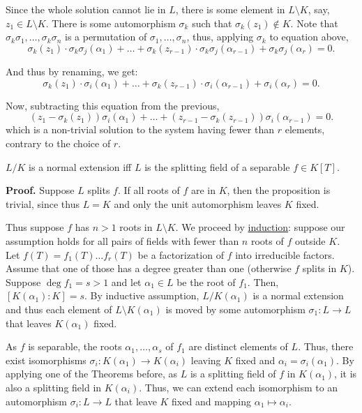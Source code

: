 \documentclass{template}
\begin{document}
Since the whole solution cannot lie in $L$, there is some element in $L
\setminus K$, say, $z_1 \in L \setminus K$. There is some automorphism
$\sigma_k$ such that $\sigma_k(z_1) \not\in K$. Note that
$\sigma_k\sigma_1,\dots,\sigma_k\sigma_n$ is a permutation of
$\sigma_1,\dots,\sigma_n$, thus, applying $\sigma_k$ to equation above,
\begin{equation*}
    \sigma_k(z_1) \cdot \sigma_k\sigma_j(\alpha_1) + \dots + \sigma_k(z_{r-1}) \cdot \sigma_k\sigma_j(\alpha_{r-1}) + \sigma_k\sigma_j(\alpha_r) = 0.
\end{equation*}

And thus by renaming, we get:
\begin{equation*}
    \sigma_k(z_1) \cdot \sigma_i(\alpha_1) + \dots + \sigma_k(z_{r-1}) \cdot \sigma_i(\alpha_{r-1}) + \sigma_i(\alpha_r) = 0.
\end{equation*}

Now, subtracting this equation from the previous,
\begin{equation*}
    (z_1-\sigma_k(z_1))\sigma_i(\alpha_1) + \dots + (z_{r-1}-\sigma_k(z_{r-1}))\sigma_i(\alpha_{r-1}) = 0.
\end{equation*}
which is a non-trivial solution to the system having fewer than $r$ elements, contrary 
to the choice of $r$.

\begin{theorem}
    $L/K$ is a normal extension iff $L$ is the splitting field of a separable $f
    \in K[T]$.
\end{theorem}

\textbf{Proof.} Suppose $L$ splits $f$. If all roots of $f$ are in $K$, then the
proposition is trivial, since thus $L=K$ and only the unit automorphism leaves
$K$ fixed.

Thus suppose $f$ has $n>1$ roots in $L\setminus K$. We proceed by
\underline{induction}: suppose our assumption holds for all pairs of fields with
fewer than $n$ roots of $f$ outside $K$. Let $f(T) = f_1(T)\dots f_r(T)$ be a
factorization of $f$ into irreducible factors. Assume that one of those has a
degree greater than one (otherwise $f$ splits in $K$). Suppose $\deg f_1 = s >
1$ and let $\alpha_1 \in L$ be the root of $f_1$. Then, $[K(\alpha_1):K] = s$.
By inductive assumption, $L/K(\alpha_1)$ is a normal extension and thus each
element of $L\setminus K(\alpha_1)$ is moved by some automorphism $\sigma_1: L
\to L$ that leaves $K(\alpha_1)$ fixed.

As $f$ is separable, the roots $\alpha_1,\dots,\alpha_s$ of $f_1$ are distinct
elements of $L$. Thus, there exist isomorphisms $\sigma_i: K(\alpha_1) \to
K(\alpha_i)$ leaving $K$ fixed and $\alpha_i = \sigma_i(\alpha_1)$. By applying
one of the Theorems before, as $L$ is a splitting field of $f$ in $K(\alpha_1)$,
it is also a splitting field in $K(\alpha_i)$. Thus, we can extend each
isomorphism to an automorphism $\sigma_i: L \to L$ that leave $K$ fixed and
mapping $\alpha_1 \mapsto \alpha_i$.
\end{document}

